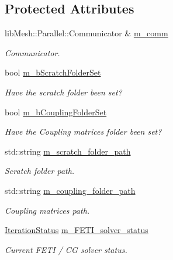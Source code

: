 \subsection*{Protected Attributes}
\begin{DoxyCompactItemize}
\item 
lib\+Mesh\+::\+Parallel\+::\+Communicator \& \hyperlink{classcarl_1_1_f_e_t_i___operations_a8cb0ed286667fc9f3ebc2d8ef2a3e13b}{m\+\_\+comm}
\begin{DoxyCompactList}\small\item\em Communicator. \end{DoxyCompactList}\item 
bool \hyperlink{classcarl_1_1_f_e_t_i___operations_a8bb9de7de35a2f7d7d5982ae1085ba15}{m\+\_\+b\+Scratch\+Folder\+Set}
\begin{DoxyCompactList}\small\item\em Have the scratch folder been set? \end{DoxyCompactList}\item 
bool \hyperlink{classcarl_1_1_f_e_t_i___operations_a99e19ecbfadee9c10545ba8ca0682f33}{m\+\_\+b\+Coupling\+Folder\+Set}
\begin{DoxyCompactList}\small\item\em Have the Coupling matrices folder been set? \end{DoxyCompactList}\item 
std\+::string \hyperlink{classcarl_1_1_f_e_t_i___operations_ad6d35bc9b5221d45452fbc8931f22055}{m\+\_\+scratch\+\_\+folder\+\_\+path}
\begin{DoxyCompactList}\small\item\em Scratch folder path. \end{DoxyCompactList}\item 
std\+::string \hyperlink{classcarl_1_1_f_e_t_i___operations_a2eee572375e0b5aab15f31fb55f2e48f}{m\+\_\+coupling\+\_\+folder\+\_\+path}
\begin{DoxyCompactList}\small\item\em Coupling matrices path. \end{DoxyCompactList}\item 
\hyperlink{namespacecarl_aa16a7148474e795cb6fea24b9159dccb}{Iteration\+Status} \hyperlink{classcarl_1_1_f_e_t_i___operations_a36365b5c60a575b2becf805d355bacff}{m\+\_\+\+F\+E\+T\+I\+\_\+solver\+\_\+status}
\begin{DoxyCompactList}\small\item\em Current F\+E\+T\+I / C\+G solver status. \end{DoxyCompactList}\item 

\end{DoxyCompactItemize}
